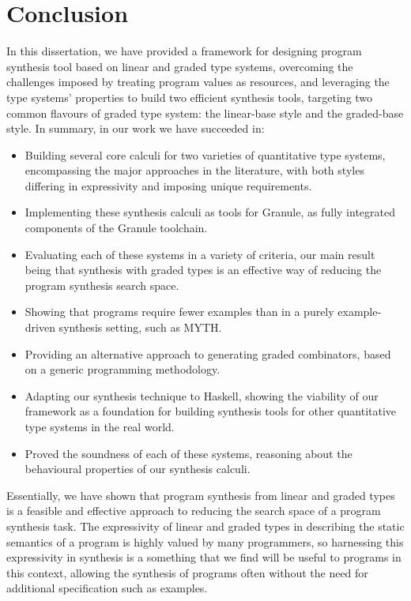 \chapter{Conclusion}
\label{chapter:conclusion}
In this dissertation, we have provided a framework for designing program
synthesis tool based on linear and graded type systems, overcoming the
challenges imposed by treating program values as resources, and leveraging the
type systems' properties to build two efficient synthesis tools, targeting two
common flavours of graded type system: the linear-base style and the graded-base
style. In summary, in our work we have succeeded in: 
\begin{itemize}
    \item Building several core calculi for two varieties of quantitative type
          systems, encompassing the major approaches in the literature, with
          both styles differing in expressivity and imposing unique
          requirements. 
    \item Implementing these synthesis calculi as tools for Granule, as fully
          integrated 
          components of the Granule toolchain. 
    \item Evaluating each of these systems in a variety of criteria, our main
          result being that synthesis with graded types is an effective way of
          reducing the program synthesis search space.  
    \item Showing that programs require fewer examples than in a purely
          example-driven synthesis setting, such as \textsc{MYTH}. 
    \item Providing an alternative approach to generating graded combinators,
    based on a generic programming methodology. 
    \item Adapting our synthesis technique to Haskell, showing the viability of
          our framework as a foundation for building synthesis tools for other
          quantitative type systems in the real world.
    \item Proved the soundness of each of these systems, reasoning about the
          behavioural properties of our synthesis calculi. 
\end{itemize}

Essentially, we have shown that program synthesis from linear and graded types
is a feasible and effective approach to reducing the search space of a program
synthesis task. The expressivity of linear and graded types in describing the
static semantics of a program is highly valued by many programmers, so
harnessing this expressivity in synthesis is a something that we find will be
useful to programs in this context, allowing the synthesis of programs often
without the need for additional specification such as examples.

